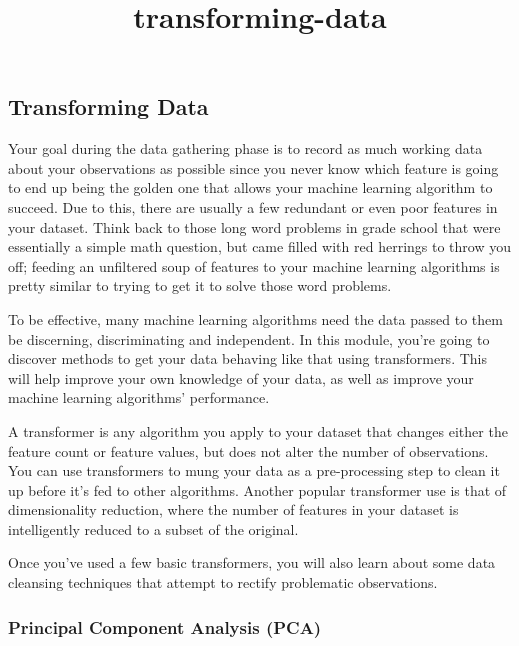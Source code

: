\documentclass[11pt]{article}
\title{transforming-data}
\begin{document}
    
    
    \maketitle
    
    

    
    \subsection{Transforming Data}\label{transforming-data}

Your goal during the data gathering phase is to record as much working
data about your observations as possible since you never know which
feature is going to end up being the golden one that allows your machine
learning algorithm to succeed. Due to this, there are usually a few
redundant or even poor features in your dataset. Think back to those
long word problems in grade school that were essentially a simple math
question, but came filled with red herrings to throw you off; feeding an
unfiltered soup of features to your machine learning algorithms is
pretty similar to trying to get it to solve those word problems.

To be effective, many machine learning algorithms need the data passed
to them be discerning, discriminating and independent. In this module,
you're going to discover methods to get your data behaving like that
using transformers. This will help improve your own knowledge of your
data, as well as improve your machine learning algorithms' performance.

A transformer is any algorithm you apply to your dataset that changes
either the feature count or feature values, but does not alter the
number of observations. You can use transformers to mung your data as a
pre-processing step to clean it up before it's fed to other algorithms.
Another popular transformer use is that of dimensionality reduction,
where the number of features in your dataset is intelligently reduced to
a subset of the original.

Once you've used a few basic transformers, you will also learn about
some data cleansing techniques that attempt to rectify problematic
observations.

    \subsubsection{Principal Component Analysis
(PCA)}\label{principal-component-analysis-pca}
\end{document}
